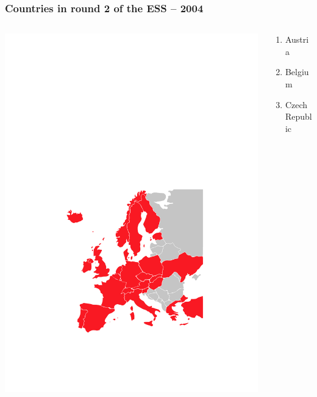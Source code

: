 \documentclass{beamer}
\begin{document}
\begin{frame}

\frametitle{Countries in round 2 of the ESS -- 2004}

	\begin{columns}[T]	
		\begin{column}{6.5cm}
			\includegraphics[width=\textwidth]{i/round2.pdf}
		\end{column}
		\begin{column}{4.5cm}
			\begin{columns}	
				\begin{column}{2cm}
					\begin{scriptsize}\begin{enumerate}
            \item Austria 	        
						\item Belgium 	        
						\item Czech Republic 	

\end{enumerate}
\end{scriptsize}
\end{column}
\end{columns}
\end{column}
\end{columns}
\end{frame}
\end{document}
